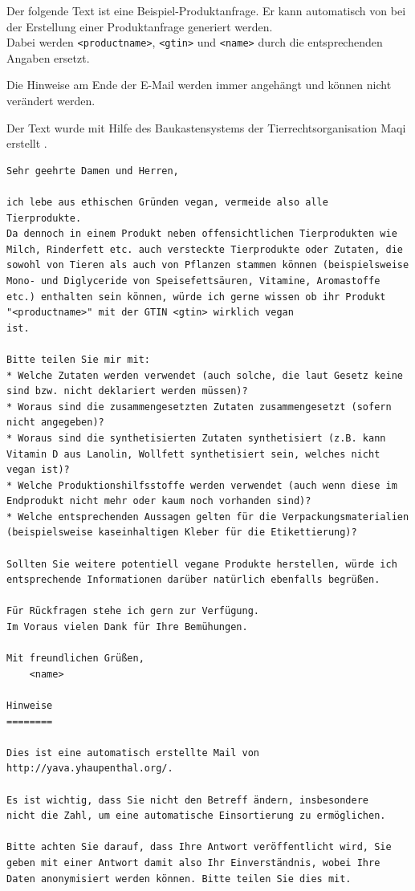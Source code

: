 \label{chap:appendix}

\label{appendix:inquiry}

Der folgende Text ist eine Beispiel-Produktanfrage. Er kann automatisch
von \name bei der Erstellung einer Produktanfrage generiert werden.\\
Dabei werden \texttt{<productname>}, \texttt{<gtin>} und \texttt{<name>}
durch die entsprechenden Angaben ersetzt.

Die Hinweise am Ende der E-Mail werden immer angehängt und können
nicht verändert werden.

Der Text wurde mit Hilfe des Baukastensystems der
Tierrechtsorganisation Maqi erstellt .

\begin{verbatim}
Sehr geehrte Damen und Herren,

ich lebe aus ethischen Gründen vegan, vermeide also alle
Tierprodukte.
Da dennoch in einem Produkt neben offensichtlichen Tierprodukten wie
Milch, Rinderfett etc. auch versteckte Tierprodukte oder Zutaten, die
sowohl von Tieren als auch von Pflanzen stammen können (beispielsweise
Mono- und Diglyceride von Speisefettsäuren, Vitamine, Aromastoffe
etc.) enthalten sein können, würde ich gerne wissen ob ihr Produkt
"<productname>" mit der GTIN <gtin> wirklich vegan
ist.

Bitte teilen Sie mir mit:
* Welche Zutaten werden verwendet (auch solche, die laut Gesetz keine
sind bzw. nicht deklariert werden müssen)?
* Woraus sind die zusammengesetzten Zutaten zusammengesetzt (sofern
nicht angegeben)?
* Woraus sind die synthetisierten Zutaten synthetisiert (z.B. kann
Vitamin D aus Lanolin, Wollfett synthetisiert sein, welches nicht
vegan ist)?
* Welche Produktionshilfsstoffe werden verwendet (auch wenn diese im
Endprodukt nicht mehr oder kaum noch vorhanden sind)?
* Welche entsprechenden Aussagen gelten für die Verpackungsmaterialien
(beispielsweise kaseinhaltigen Kleber für die Etikettierung)?

Sollten Sie weitere potentiell vegane Produkte herstellen, würde ich
entsprechende Informationen darüber natürlich ebenfalls begrüßen.

Für Rückfragen stehe ich gern zur Verfügung.
Im Voraus vielen Dank für Ihre Bemühungen.

Mit freundlichen Grüßen,
    <name>

Hinweise
========

Dies ist eine automatisch erstellte Mail von 
http://yava.yhaupenthal.org/.

Es ist wichtig, dass Sie nicht den Betreff ändern, insbesondere
nicht die Zahl, um eine automatische Einsortierung zu ermöglichen.

Bitte achten Sie darauf, dass Ihre Antwort veröffentlicht wird, Sie
geben mit einer Antwort damit also Ihr Einverständnis, wobei Ihre
Daten anonymisiert werden können. Bitte teilen Sie dies mit.
\end{verbatim}

